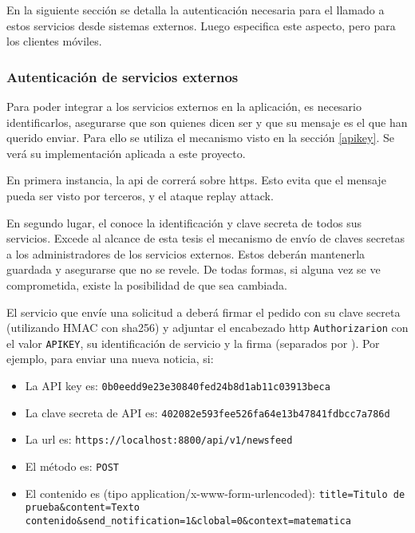 En la siguiente sección se detalla la autenticación necesaria para el llamado a estos servicios desde sistemas externos. Luego especifica este aspecto, pero para los clientes móviles.

\subsubsection{Autenticación de servicios externos}
\label{autenticacion_servicios_externos}

Para poder integrar a los servicios externos en la aplicación, es necesario identificarlos, asegurarse que son quienes dicen ser y que su mensaje es el que han querido enviar. Para ello se utiliza el mecanismo visto en la sección \ref{apikey}. Se verá su implementación aplicada a este proyecto.

En primera instancia, la \gls{api} de \nombreApp{} correrá sobre \gls{https}. Esto evita que el mensaje pueda ser visto por terceros, y el ataque \gls{replay attack}.

En segundo lugar, el  conoce la identificación y clave secreta de todos sus servicios. Excede al alcance de esta tesis el mecanismo de envío de claves secretas a los administradores de los servicios externos. Estos deberán mantenerla guardada y asegurarse que no se revele. De todas formas, si alguna vez se ve comprometida, existe la posibilidad de que sea cambiada.

El servicio que envíe una solicitud a \nombreApp{} deberá firmar el pedido con su clave secreta (utilizando HMAC con sha256) y adjuntar el encabezado \gls{http} \lstinline{Authorizarion} con el valor \lstinline{APIKEY}, su identificación de servicio y la firma (separados por ). Por ejemplo, para enviar una nueva noticia, si:
\begin{itemize}
\item La API key es: \lstinline{0b0eedd9e23e30840fed24b8d1ab11c03913beca}

\item La clave secreta de API es: \lstinline{402082e593fee526fa64e13b47841fdbcc7a786d}

\item La \gls{url} es: \lstinline{https://localhost:8800/api/v1/newsfeed}

\item El método es: \lstinline{POST}

\item El contenido es (tipo application/x-www-form-urlencoded): \lstinline{title=Titulo de prueba&content=Texto contenido&send_notification=1&clobal=0&context=matematica}

\end{itemize}

